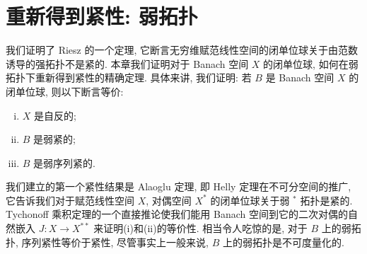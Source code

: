 \documentclass[../main.tex]{subfiles}
\begin{document}
\chapter{重新得到紧性: 弱拓扑}\label{chapter:ch15-weak-topology}

我们证明了 Riesz 的一个定理, 它断言无穷维赋范线性空间的闭单位球关于由范数诱导的强拓扑不是紧的. 本章我们证明对于 Banach 空间 $X$ 的闭单位球, 如何在弱拓扑下重新得到紧性的精确定理. 具体来讲, 我们证明: 若 $B$ 是 Banach 空间 $X$ 的闭单位球, 则以下断言等价:
\begin{enumerate}[(i)]
\item $X$ 是自反的;
\item $B$ 是弱紧的;
\item $B$ 是弱序列紧的.
\end{enumerate}

我们建立的第一个紧性结果是 Alaoglu 定理, 即 Helly 定理在不可分空间的推广, 它告诉我们对于赋范线性空间 $X$, 对偶空间 $X^{*}$ 的闭单位球关于弱 $^{*}$ 拓扑是紧的. Tychonoff 乘积定理的一个直接推论使我们能用 Banach 空间到它的二次对偶的自然嵌入 $J:X\to X^{**}$ 来证明(i)和(ii)的等价性. 相当令人吃惊的是, 对于 $B$ 上的弱拓扑, 序列紧性等价于紧性, 尽管事实上一般来说, $B$ 上的弱拓扑是不可度量化的.








\end{document}
